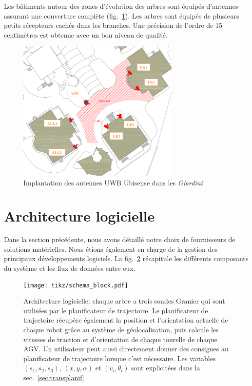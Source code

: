\documentclass[french,A4paper,]{book}
\begin{document}
Les bâtiments autour des zones d'évolution des arbres sont équipés
d'antennes assurant une couverture complète (fig.~\ref{fig:ubisense}).
Les arbres sont équipés de plusieurs petits récepteurs cachés dans les
branches. Une précision de l'ordre de 15 centimètres est obtenue avec un
bon niveau de qualité.

\begin{figure}
\centering
\includegraphics[height=7.00000cm]{imgs/plan_capteurs.png}
\caption{Implantation des antennes UWB Ubisense dans les
\emph{Giardini}}\label{fig:ubisense}
\end{figure}

\section{Architecture logicielle}\label{sec:transarchi}

Dans la section précédente, nous avons détaillé notre choix de
fournisseurs de solutions matérielles. Nous étions également en charge
de la gestion des principaux développements logiciels. La
fig.~\ref{fig:soft} récapitule les différents composants du système et
les flux de données entre eux.

\begin{figure}
\centering
\texttt{[image: tikz/schema\_block.pdf]}
\caption{Architecture logicielle: chaque arbre a trois sondes Granier
qui sont utilisées par le planificateur de trajectoire. Le planificateur
de trajectoire récupère également la position et l'orientation actuelle
de chaque robot grâce au système de géolocalisation, puis calcule les
vitesses de traction et d'orientation de chaque tourelle de chaque AGV.
Un utilisateur peut aussi directement donner des consignes au
planificateur de trajectoire lorsque c'est nécessaire. Les variables
\((s_1, s_2, s_3)\), \((x, y, \alpha)\) et \((v_i, \theta_i)\) sont
explicitées dans la sec.~\ref{sec:transplanif}}\label{fig:soft}
\end{figure}
\end{document}
